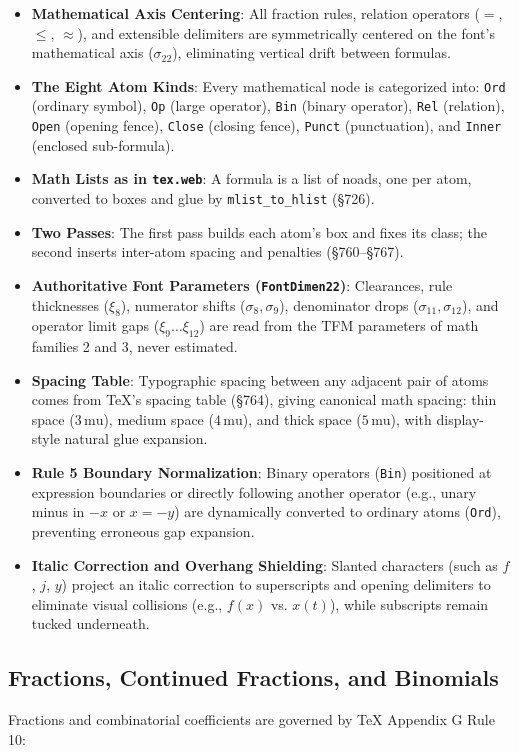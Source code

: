 \documentclass[11pt, a4paper]{article}
\begin{document}
\begin{itemize}
\item \textbf{Mathematical Axis Centering}: All fraction rules, relation operators ($=$, $\le$, $\approx$), and extensible delimiters are symmetrically centered on the font's mathematical axis ($\sigma_{22}$), eliminating vertical drift between formulas.
\item \textbf{The Eight Atom Kinds}: Every mathematical node is categorized into: \texttt{Ord} (ordinary symbol), \texttt{Op} (large operator), \texttt{Bin} (binary operator), \texttt{Rel} (relation), \texttt{Open} (opening fence), \texttt{Close} (closing fence), \texttt{Punct} (punctuation), and \texttt{Inner} (enclosed sub-formula).
\item \textbf{Math Lists as in \texttt{tex.web}}: A formula is a list of noads, one per atom, converted to boxes and glue by \texttt{mlist\_to\_hlist} (\S726).
\item \textbf{Two Passes}: The first pass builds each atom's box and fixes its class; the second inserts inter-atom spacing and penalties (\S760--\S767).
\item \textbf{Authoritative Font Parameters (\texttt{FontDimen22})}: Clearances, rule thicknesses ($\xi_8$), numerator shifts ($\sigma_8, \sigma_9$), denominator drops ($\sigma_{11}, \sigma_{12}$), and operator limit gaps ($\xi_9 \dots \xi_{12}$) are read from the TFM parameters of math families 2 and 3, never estimated.
\item \textbf{Spacing Table}: Typographic spacing between any adjacent pair of atoms comes from TeX's spacing table (\S764), giving canonical math spacing: thin space ($3\,\text{mu}$), medium space ($4\,\text{mu}$), and thick space ($5\,\text{mu}$), with display-style natural glue expansion.
\item \textbf{Rule 5 Boundary Normalization}: Binary operators (\texttt{Bin}) positioned at expression boundaries or directly following another operator (e.g., unary minus in $-x$ or $x = -y$) are dynamically converted to ordinary atoms (\texttt{Ord}), preventing erroneous gap expansion.
\item \textbf{Italic Correction and Overhang Shielding}: Slanted characters (such as $f$, $j$, $y$) project an italic correction to superscripts and opening delimiters to eliminate visual collisions (e.g., $f(x)$ vs. $x(t)$), while subscripts remain tucked underneath.
\end{itemize}

\subsection{Fractions, Continued Fractions, and Binomials}
Fractions and combinatorial coefficients are governed by TeX Appendix G Rule 10:
\end{document}
